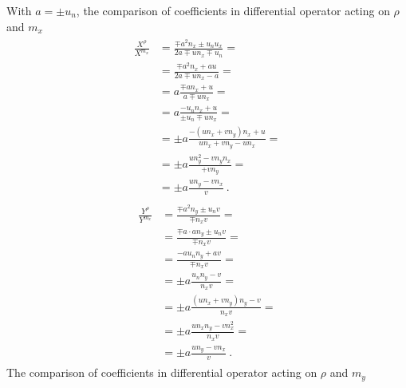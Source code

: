 \documentclass[letterpaper,10pt,english]{jupyterBook}
\begin{document}
\sphinxAtStartPar
With \(a = \pm u_n\), the comparison of coefficients in differential operator acting on \(\rho\) and \(m_x\)
\begin{equation*}
\begin{split}\begin{aligned}
  \frac{X^{\rho}}{X^{m_x}}
  & = \frac{\mp a^2 n_x \pm u_n u_x}{2a \mp u n_x \mp u_n} = \\ 
  & = \frac{\mp a^2 n_x + a u}{2a \mp u n_x - a} = \\ 
  & = a \frac{\mp a n_x + u}{ a \mp u n_x    } = \\ 
  & = a \frac{- u_n n_x + u}{ \pm u_n \mp u n_x    } = \\ 
  & = \pm a \frac{- ( u n_x + v n_y ) n_x + u}{  u n_x + v n_y - u n_x    } = \\ 
  & = \pm a \frac{ u n_y^2 - v n_y n_x }{  + v n_y  } = \\ 
  & = \pm a \frac{ u n_y - v n_x }{ v } \ .
\end{aligned}\end{split}
\end{equation*}\begin{equation*}
\begin{split}\begin{aligned}
  \frac{Y^{\rho}}{Y^{m_x}}
  & = \frac{\mp a^2 n_y \pm u_n v}{\mp n_x v} = \\
  & = \frac{\mp a \cdot a n_y \pm u_n v}{\mp n_x v} = \\
  & = \frac{- a u_n n_y + a v}{\mp n_x v} = \\
  & = \pm a \frac{ u_n n_y - v}{ n_x v} = \\
  & = \pm a \frac{ ( u n_x + v n_y ) n_y - v}{ n_x v} = \\
  & = \pm a \frac{ u n_x n_y - v n_x^2}{ n_x v } = \\
  & = \pm a \frac{ u n_y - v n_x  }{ v } \ .
\end{aligned}\end{split}
\end{equation*}
\sphinxAtStartPar
The comparison of coefficients in differential operator acting on \(\rho\) and \(m_y\)
\end{document}
